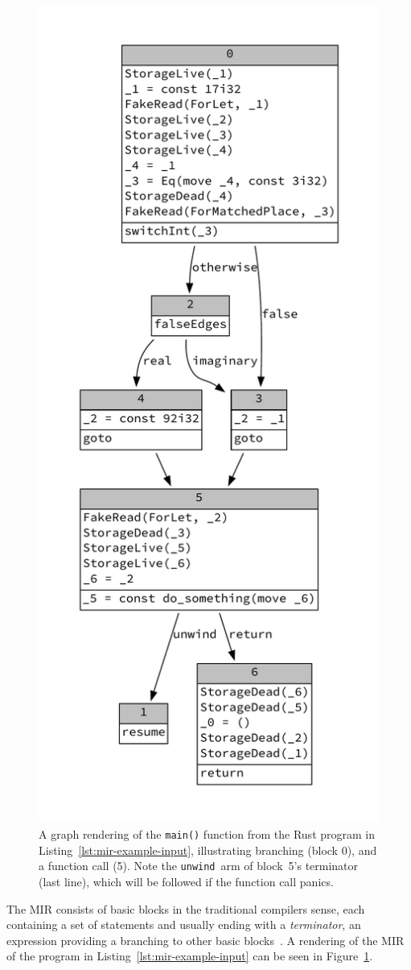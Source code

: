 \documentclass[11pt,a4paper,twoside,openany]{report}
\newcommand{\InRust}[1]{\texttt{#1}}
\begin{document}
\begin{figure}
  \includegraphics[width=0.65\linewidth]{Graphs/mir-example}
  \caption{A graph rendering of the \InRust{main()} function from the Rust
    program in Listing~\ref{lst:mir-example-input}, illustrating branching
    (block 0), and a function call (5). Note the \texttt{unwind}~arm of block~5's
    terminator (last line), which will be followed if the function call panics.}
  \label{fig:mir-example}
\end{figure}

The MIR consists of basic blocks in the traditional compilers sense, each
containing a set of statements and usually ending with a \emph{terminator}, an
expression providing a branching to other basic
blocks~\cite{mir_rfc,rustc_developers_guide_nodate}. A rendering of the MIR of
the program in Listing~\ref{lst:mir-example-input} can be seen in
Figure~\ref{fig:mir-example}.
\end{document}
